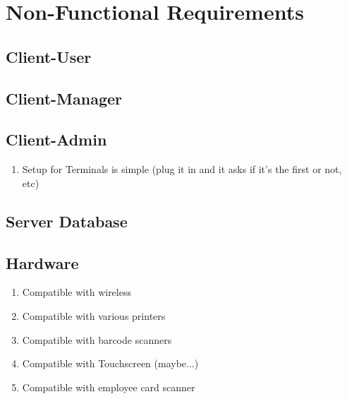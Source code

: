 \chapter{Non-Functional Requirements}
\label{02_NonFuncReqs}

\section{Client-User}


\section{Client-Manager}


\section{Client-Admin}
\begin{enumerate}
	\item Setup for Terminals is simple (plug it in and it asks if it's the first or not, etc)
\end{enumerate}

\section{Server Database}


\section{Hardware}
\begin{enumerate}
	\item Compatible with wireless
	\item Compatible with various printers
	\item Compatible with barcode scanners
	\item Compatible with Touchscreen (maybe...)
	\item Compatible with employee card scanner
\end{enumerate}